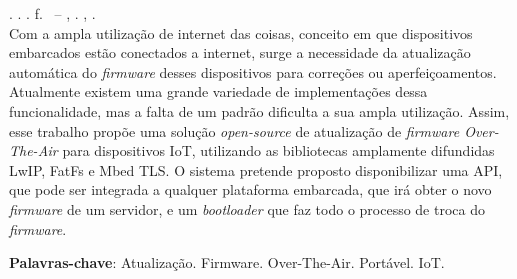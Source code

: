
\begin{resumo}[RESUMO]
\begin{SingleSpacing}

\imprimirautorcitacao. \imprimirtitulo. \imprimirdata. \pageref {LastPage} f. \imprimirprojeto\ – \imprimirdepartamento, \imprimirinstituicao. \imprimirlocal, \imprimirdata.\\


Com a ampla utilização  de internet das coisas, conceito em que dispositivos embarcados estão conectados a internet, surge a necessidade da atualização automática do \textit{firmware} desses dispositivos para correções ou aperfeiçoamentos. Atualmente existem uma grande variedade de implementações dessa funcionalidade, mas a falta de um padrão dificulta a sua ampla utilização.
Assim, esse trabalho propõe uma solução \textit{open-source} de atualização de \textit{firmware Over-The-Air} para dispositivos IoT, utilizando as bibliotecas amplamente difundidas LwIP, FatFs e Mbed TLS.
O sistema pretende proposto disponibilizar uma API, que pode ser integrada a qualquer plataforma embarcada, que irá obter o novo \textit{firmware} de um servidor, e um \textit{bootloader} que faz todo o processo de troca do \textit{firmware}.


\textbf{Palavras-chave}: Atualização. Firmware. Over-The-Air. Portável. IoT.




\end{SingleSpacing}
\end{resumo}


